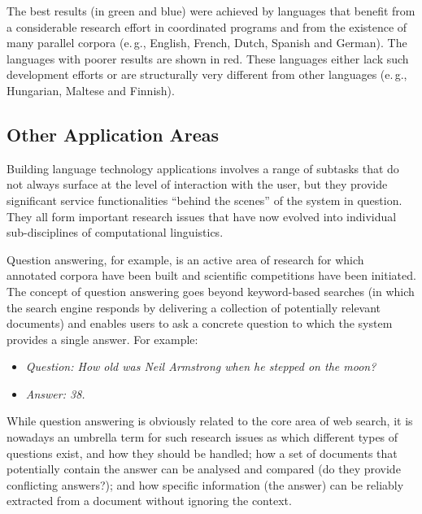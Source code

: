 \begin{multicols}{2}
The best results (in green and blue) were achieved by languages that benefit from a considerable research effort in coordinated programs and from the existence of many parallel corpora (e.\,g., English, French, Dutch, Spanish and German). The languages with poorer results are shown in red. These languages either lack such development efforts or are structurally very different from other languages (e.\,g., Hungarian, Maltese and Finnish).










\subsection{Other Application Areas}

Building language technology applications involves a range of subtasks
that do not always surface at the level of interaction with the user,
but they provide significant service functionalities
“behind the scenes” of the system in
question. They all form important research issues that have now
evolved into individual sub-disciplines of computational linguistics. 

Question answering, for example, is an active area of research for which annotated corpora have been built and scientific competitions have been initiated. The concept of question answering goes beyond keyword-based searches (in which the search engine responds by delivering a collection of potentially relevant documents) and enables users to ask a concrete question to which the system provides a single answer. For example:

\begin{itemize}
\item[] \textit{Question: How old was Neil Armstrong when he stepped on the moon?}
\item[] \textit{Answer: 38.}
\end{itemize}

While question answering is obviously related to the core area of web search, it is nowadays an umbrella term for such research issues as which different types of questions exist, and how they should be handled; how a set of documents that potentially contain the answer can be analysed and compared (do they provide conflicting answers?); and how specific information (the answer) can be reliably extracted from a document without ignoring the context. 



\end{multicols}
